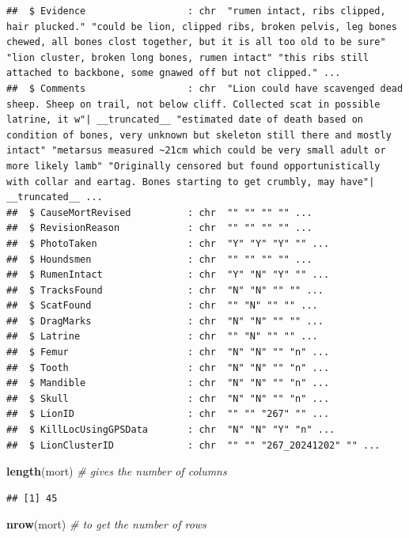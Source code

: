 \documentclass[
]{book}
\newenvironment{Shaded}{\begin{snugshade}}{\end{snugshade}}
\newcommand{\CommentTok}[1]{\textcolor[rgb]{0.56,0.35,0.01}{\textit{#1}}}
\newcommand{\FunctionTok}[1]{\textcolor[rgb]{0.13,0.29,0.53}{\textbf{#1}}}
\newcommand{\NormalTok}[1]{#1}
\begin{document}
\begin{verbatim}
##  $ Evidence                  : chr  "rumen intact, ribs clipped, hair plucked." "could be lion, clipped ribs, broken pelvis, leg bones chewed, all bones clost together, but it is all too old to be sure" "lion cluster, broken long bones, rumen intact" "this ribs still attached to backbone, some gnawed off but not clipped." ...
##  $ Comments                  : chr  "Lion could have scavenged dead sheep. Sheep on trail, not below cliff. Collected scat in possible latrine, it w"| __truncated__ "estimated date of death based on condition of bones, very unknown but skeleton still there and mostly intact" "metarsus measured ~21cm which could be very small adult or more likely lamb" "Originally censored but found opportunistically with collar and eartag. Bones starting to get crumbly, may have"| __truncated__ ...
##  $ CauseMortRevised          : chr  "" "" "" "" ...
##  $ RevisionReason            : chr  "" "" "" "" ...
##  $ PhotoTaken                : chr  "Y" "Y" "Y" "" ...
##  $ Houndsmen                 : chr  "" "" "" "" ...
##  $ RumenIntact               : chr  "Y" "N" "Y" "" ...
##  $ TracksFound               : chr  "N" "N" "" "" ...
##  $ ScatFound                 : chr  "" "N" "" "" ...
##  $ DragMarks                 : chr  "N" "N" "" "" ...
##  $ Latrine                   : chr  "" "N" "" "" ...
##  $ Femur                     : chr  "N" "N" "" "n" ...
##  $ Tooth                     : chr  "N" "N" "" "n" ...
##  $ Mandible                  : chr  "N" "N" "" "n" ...
##  $ Skull                     : chr  "N" "N" "" "n" ...
##  $ LionID                    : chr  "" "" "267" "" ...
##  $ KillLocUsingGPSData       : chr  "N" "N" "Y" "n" ...
##  $ LionClusterID             : chr  "" "" "267_20241202" "" ...
\end{verbatim}

\begin{Shaded}
\begin{Highlighting}[]
\FunctionTok{length}\NormalTok{(mort) }\CommentTok{\# gives the number of columns}
\end{Highlighting}
\end{Shaded}

\begin{verbatim}
## [1] 45
\end{verbatim}

\begin{Shaded}
\begin{Highlighting}[]
\FunctionTok{nrow}\NormalTok{(mort) }\CommentTok{\# to get the number of rows}
\end{Highlighting}
\end{Shaded}
\end{document}

